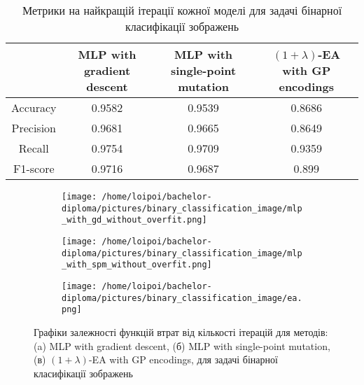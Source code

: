 \begin{table}[ht]
	\centering
	\begin{adjustbox}{max width=\textwidth}
		\begin{tabular}{|c|c|c|c|}
			\hline 
			& MLP with gradient descent & MLP with single-point mutation & $(1+\lambda)$-EA with GP encodings \\
			\hline 
			Accuracy & 0.9582 & 0.9539 & 0.8686 \\
			\hline 
			Precision & 0.9681 & 0.9665 & 0.8649 \\
			\hline
			Recall & 0.9754 & 0.9709 & 0.9359 \\
			\hline
			F1-score & 0.9716 & 0.9687 & 0.899 \\
			\hline
		\end{tabular}
	\end{adjustbox}
	\caption{Метрики на найкращій ітерації кожної моделі для задачі бінарної класифікації зображень}
	\label{metrics_bc_id_results}
\end{table}

\begin{figure}[ht]
	\centering
	\begin{subfigure}[b]{0.32\textwidth}    
		\texttt{[image: /home/loipoi/bachelor-diploma/pictures/binary\_classification\_image/mlp\_with\_gd\_without\_overfit.png]}
		\caption{}
	\end{subfigure}	
	\begin{subfigure}[b]{0.32\textwidth}
		\texttt{[image: /home/loipoi/bachelor-diploma/pictures/binary\_classification\_image/mlp\_with\_spm\_without\_overfit.png]}
		\caption{}
	\end{subfigure}	
	\begin{subfigure}[b]{0.32\textwidth}
		\texttt{[image: /home/loipoi/bachelor-diploma/pictures/binary\_classification\_image/ea.png]}
		\caption{}
	\end{subfigure}
	
	\caption{Графіки залежності функцій втрат від кількості ітерацій для методів: (a) MLP with gradient descent, (б) MLP with single-point mutation, (в) $(1+\lambda)$-EA with GP encodings, для задачі бінарної класифікації зображень}
	\label{fig_losses_bc_id}
\end{figure}

